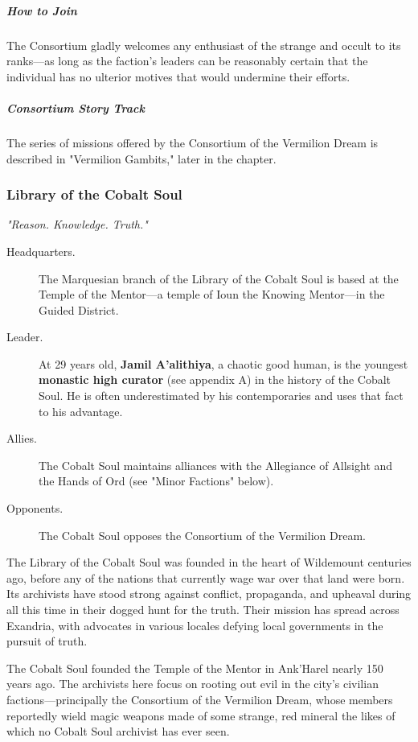 \documentclass[10pt,a4paper,twoside,bg=print,twocolumn,openany,nodeprecatedcode]{dndbook}
\begin{document}
\subparagraph{How to Join}
The Consortium gladly welcomes any enthusiast of the strange and occult to its ranks—as long as the faction's leaders can be reasonably certain that the individual has no ulterior motives that would undermine their efforts.

\subparagraph{Consortium Story Track}
The series of missions offered by the Consortium of the Vermilion Dream is described in "Vermilion Gambits," later in the chapter.

\subsubsection{Library of the Cobalt Soul}
\textit{"Reason. Knowledge. Truth."}


\begin{description}
\item[Headquarters.]
The Marquesian branch of the Library of the Cobalt Soul is based at the Temple of the Mentor—a temple of Ioun the Knowing Mentor—in the Guided District.
\end{description}


\begin{description}
\item[Leader.]
At 29 years old, \textbf{Jamil A'alithiya}, a chaotic good human, is the youngest \textbf{monastic high curator} (see appendix A) in the history of the Cobalt Soul. He is often underestimated by his contemporaries and uses that fact to his advantage.
\item[Allies.]
The Cobalt Soul maintains alliances with the Allegiance of Allsight and the Hands of Ord (see "Minor Factions" below).
\item[Opponents.]
The Cobalt Soul opposes the Consortium of the Vermilion Dream.
\end{description}

The Library of the Cobalt Soul was founded in the heart of Wildemount centuries ago, before any of the nations that currently wage war over that land were born. Its archivists have stood strong against conflict, propaganda, and upheaval during all this time in their dogged hunt for the truth. Their mission has spread across Exandria, with advocates in various locales defying local governments in the pursuit of truth.

The Cobalt Soul founded the Temple of the Mentor in Ank'Harel nearly 150 years ago. The archivists here focus on rooting out evil in the city's civilian factions—principally the Consortium of the Vermilion Dream, whose members reportedly wield magic weapons made of some strange, red mineral the likes of which no Cobalt Soul archivist has ever seen.
\end{document}
